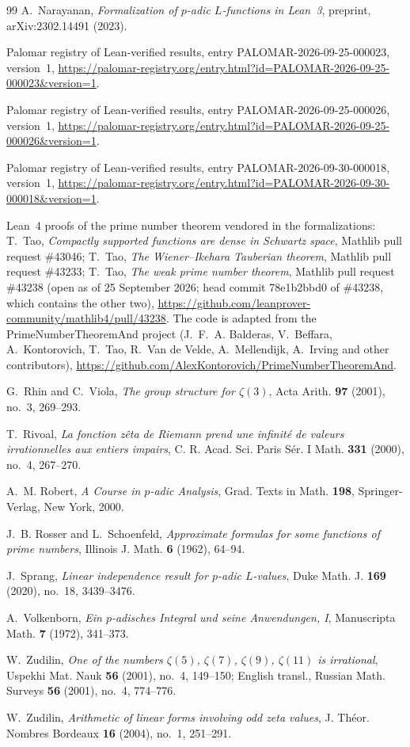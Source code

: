\documentclass{amsart}
\theoremstyle{definition}
\theoremstyle{remark}
\numberwithin{equation}{section}
\begin{document}
\begin{thebibliography}{99}
A.~Narayanan, \emph{Formalization of $p$-adic $L$-functions in Lean~3},
preprint, arXiv:2302.14491 (2023).

Palomar registry of Lean-verified results, entry PALOMAR-2026-09-25-000023,
version~1,
\url{https://palomar-registry.org/entry.html?id=PALOMAR-2026-09-25-000023&version=1}.

Palomar registry of Lean-verified results, entry PALOMAR-2026-09-25-000026,
version~1,
\url{https://palomar-registry.org/entry.html?id=PALOMAR-2026-09-25-000026&version=1}.

Palomar registry of Lean-verified results, entry PALOMAR-2026-09-30-000018,
version~1,
\url{https://palomar-registry.org/entry.html?id=PALOMAR-2026-09-30-000018&version=1}.

Lean~4 proofs of the prime number theorem vendored in the formalizations:
T.~Tao, \emph{Compactly supported functions are dense in Schwartz space},
Mathlib pull request \#43046; T.~Tao, \emph{The Wiener--Ikehara Tauberian
theorem}, Mathlib pull request \#43233; T.~Tao, \emph{The weak prime number
theorem}, Mathlib pull request \#43238 (open as of 25 September 2026; head
commit 78e1b2bbd0 of \#43238, which contains the other two),
\url{https://github.com/leanprover-community/mathlib4/pull/43238}. The code
is adapted from the PrimeNumberTheoremAnd project (J.~F.~A. Balderas,
V.~Beffara, A.~Kontorovich, T.~Tao, R.~Van de Velde, A.~Mellendijk,
A.~Irving and other contributors),
\url{https://github.com/AlexKontorovich/PrimeNumberTheoremAnd}.

G.~Rhin and C.~Viola, \emph{The group structure for $\zeta(3)$}, Acta Arith.
\textbf{97} (2001), no.~3, 269--293.

T.~Rivoal, \emph{La fonction z\^eta de Riemann prend une infinit\'e de valeurs
irrationnelles aux entiers impairs}, C. R. Acad. Sci. Paris S\'er. I Math.
\textbf{331} (2000), no.~4, 267--270.

A.~M. Robert, \emph{A Course in $p$-adic Analysis}, Grad. Texts in Math.
\textbf{198}, Springer-Verlag, New York, 2000.

J.~B. Rosser and L.~Schoenfeld, \emph{Approximate formulas for some functions
of prime numbers}, Illinois J. Math. \textbf{6} (1962), 64--94.

J.~Sprang, \emph{Linear independence result for $p$-adic $L$-values}, Duke
Math. J. \textbf{169} (2020), no.~18, 3439--3476.

A.~Volkenborn, \emph{Ein $p$-adisches Integral und seine Anwendungen, I},
Manuscripta Math. \textbf{7} (1972), 341--373.

W.~Zudilin, \emph{One of the numbers $\zeta(5)$, $\zeta(7)$, $\zeta(9)$,
$\zeta(11)$ is irrational}, Uspekhi Mat. Nauk \textbf{56} (2001), no.~4,
149--150; English transl., Russian Math. Surveys \textbf{56} (2001), no.~4,
774--776.

W.~Zudilin, \emph{Arithmetic of linear forms involving odd zeta values},
J. Th\'eor. Nombres Bordeaux \textbf{16} (2004), no.~1, 251--291.

\end{thebibliography}
\end{document}
